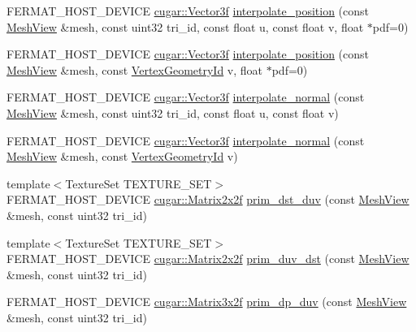 \begin{DoxyCompactItemize}
\item 
F\+E\+R\+M\+A\+T\+\_\+\+H\+O\+S\+T\+\_\+\+D\+E\+V\+I\+CE \hyperlink{structcugar_1_1_vector}{cugar\+::\+Vector3f} \hyperlink{group___mesh_module_ga9eea5d10bfff40b7f050910a97212189}{interpolate\+\_\+position} (const \hyperlink{struct_mesh_view}{Mesh\+View} \&mesh, const uint32 tri\+\_\+id, const float u, const float v, float $\ast$pdf=0)
\item 
F\+E\+R\+M\+A\+T\+\_\+\+H\+O\+S\+T\+\_\+\+D\+E\+V\+I\+CE \hyperlink{structcugar_1_1_vector}{cugar\+::\+Vector3f} \hyperlink{group___mesh_module_ga84038ff8b109ab0b5cab8d5557b94d8d}{interpolate\+\_\+position} (const \hyperlink{struct_mesh_view}{Mesh\+View} \&mesh, const \hyperlink{struct_vertex_geometry_id}{Vertex\+Geometry\+Id} v, float $\ast$pdf=0)
\item 
F\+E\+R\+M\+A\+T\+\_\+\+H\+O\+S\+T\+\_\+\+D\+E\+V\+I\+CE \hyperlink{structcugar_1_1_vector}{cugar\+::\+Vector3f} \hyperlink{group___mesh_module_gac16c0ec581833a6cf3f821d0edeb698b}{interpolate\+\_\+normal} (const \hyperlink{struct_mesh_view}{Mesh\+View} \&mesh, const uint32 tri\+\_\+id, const float u, const float v)
\item 
F\+E\+R\+M\+A\+T\+\_\+\+H\+O\+S\+T\+\_\+\+D\+E\+V\+I\+CE \hyperlink{structcugar_1_1_vector}{cugar\+::\+Vector3f} \hyperlink{group___mesh_module_ga08fec3c8389f53f7493c6292d3bab80b}{interpolate\+\_\+normal} (const \hyperlink{struct_mesh_view}{Mesh\+View} \&mesh, const \hyperlink{struct_vertex_geometry_id}{Vertex\+Geometry\+Id} v)
\item 
{\footnotesize template$<$Texture\+Set T\+E\+X\+T\+U\+R\+E\+\_\+\+S\+ET$>$ }\\F\+E\+R\+M\+A\+T\+\_\+\+H\+O\+S\+T\+\_\+\+D\+E\+V\+I\+CE \hyperlink{structcugar_1_1_matrix}{cugar\+::\+Matrix2x2f} \hyperlink{group___mesh_module_gae02af2f5ef03be32fc7743d596f34ae9}{prim\+\_\+dst\+\_\+duv} (const \hyperlink{struct_mesh_view}{Mesh\+View} \&mesh, const uint32 tri\+\_\+id)
\item 
{\footnotesize template$<$Texture\+Set T\+E\+X\+T\+U\+R\+E\+\_\+\+S\+ET$>$ }\\F\+E\+R\+M\+A\+T\+\_\+\+H\+O\+S\+T\+\_\+\+D\+E\+V\+I\+CE \hyperlink{structcugar_1_1_matrix}{cugar\+::\+Matrix2x2f} \hyperlink{group___mesh_module_gafd6fb57679fabecda3d5837dc29e3401}{prim\+\_\+duv\+\_\+dst} (const \hyperlink{struct_mesh_view}{Mesh\+View} \&mesh, const uint32 tri\+\_\+id)
\item 
F\+E\+R\+M\+A\+T\+\_\+\+H\+O\+S\+T\+\_\+\+D\+E\+V\+I\+CE \hyperlink{structcugar_1_1_matrix}{cugar\+::\+Matrix3x2f} \hyperlink{group___mesh_module_ga2ec8688996dc87889bb37d46de8a9783}{prim\+\_\+dp\+\_\+duv} (const \hyperlink{struct_mesh_view}{Mesh\+View} \&mesh, const uint32 tri\+\_\+id)

\end{DoxyCompactItemize}

